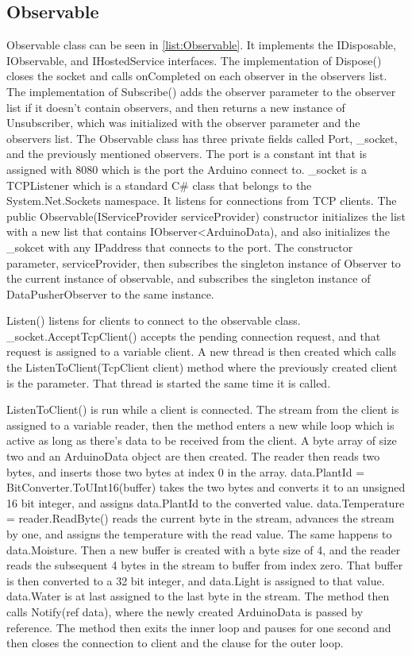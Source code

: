 \documentclass[a4paper,12pt,twoside,openright,titlepage]{book}
\begin{document}
\subsection{Observable}
Observable class can be seen in \ref{list:Observable}. It implements the IDisposable, IObservable, and IHostedService interfaces. The implementation of Dispose() closes the socket and calls onCompleted on each observer in the observers list. The implementation of Subscribe() adds the observer parameter to the observer list if it doesn't contain observers, and then returns a new instance of Unsubscriber, which was initialized with the observer parameter and the observers list. The Observable class has three private fields called Port, \_socket, and the previously mentioned observers. The port is a constant int that is assigned with 8080 which is the port the Arduino connect to. \_socket is a TCPListener which is a standard C\# class that belongs to the System.Net.Sockets namespace. It listens for connections from TCP clients. The public Observable(IServiceProvider serviceProvider) constructor initializes the list with a new list that contains IObserver<ArduinoData), and also initializes the \_sokcet with any IPaddress that connects to the port. The constructor parameter, serviceProvider, then subscribes the singleton instance of Observer to the current instance of observable, and subscribes the singleton instance of DataPusherObserver to the same instance.

Listen() listens for clients to connect to the observable class. \_socket.AcceptTcpClient() accepts the pending connection request, and that request is assigned to a variable client. A new thread is then created which calls the ListenToClient(TcpClient client) method where the previously created client is the parameter. That thread is started the same time it is called.

ListenToClient() is run while a client is connected. The stream from the client is assigned to a variable reader, then the method enters a new while loop which is active as long as there's data to be received from the client. A byte array of size two and an ArduinoData object are then created. The reader then reads two bytes, and inserts those two bytes at index 0 in the array. data.PlantId = BitConverter.ToUInt16(buffer) takes the two bytes and converts it to an unsigned 16 bit integer, and assigns data.PlantId to the converted value. data.Temperature = reader.ReadByte() reads the current byte in the stream, advances the stream by one, and assigns the temperature with the read value. The same happens to data.Moisture. Then a new buffer is created with a byte size of 4, and the reader reads the subsequent 4 bytes in the stream to buffer from index zero. That buffer is then converted to a 32 bit integer, and data.Light is assigned to that value. data.Water is at last assigned to the last byte in the stream. The method then calls Notify(ref data), where the newly created ArduinoData is passed by reference. The method then exits the inner loop and pauses for one second and then closes the connection to client and the clause for the outer loop.
\end{document}
